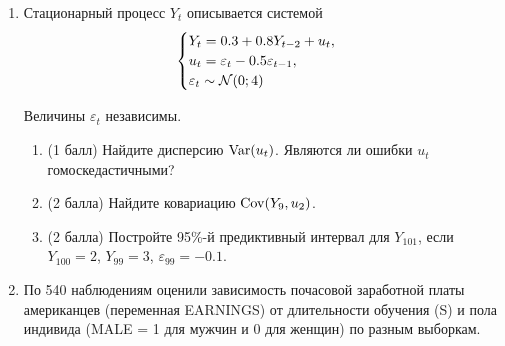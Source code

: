 \begin{enumerate}

\item %
Стационарный процесс $Y_t$ описывается системой 
 \[
 \begin{cases}
   Y_t=0.3 + 0.8 Y_{t-2} + u_t, \\
   u_t = \varepsilon_t - 0.5 \varepsilon_{t-1},   \\
   \varepsilon_t \sim \mathcal{N}(0; 4) 
  \end{cases}
\]

Величины $\varepsilon_t$ независимы. 

\begin{enumerate}
\item (1 балл) Найдите дисперсию $\operatorname{Var}(u_t)$. Являются ли ошибки $u_t$ гомоскедастичными? 
\item (2 балла) Найдите ковариацию $\operatorname{Cov}(Y_9, u_2)$.

\item (2 балла) Постройте 95\%-й предиктивный интервал для $Y_{101}$, 
 если $Y_{100} = 2$, $Y_{99} = 3$, $\varepsilon_{99}=-0.1$.
\end{enumerate}
    

\item  %

     По 540 наблюдениям оценили зависимость почасовой заработной
    платы американцев (переменная EARNINGS) от длительности обучения (S) и пола индивида (MALE = 1 для мужчин и 0 для женщин) по разным выборкам.


\end{enumerate}
